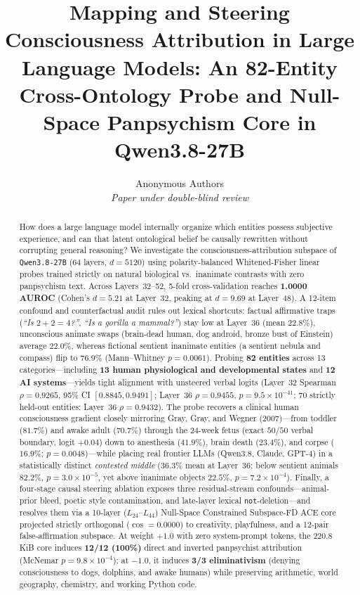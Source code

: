 \documentclass[10pt,twocolumn]{article}
\title{\Large\bfseries Mapping and Steering Consciousness Attribution in Large Language Models: An 82-Entity Cross-Ontology Probe and Null-Space Panpsychism Core in Qwen3.8-27B}
\author{Anonymous Authors \\ \textit{Paper under double-blind review}}
\date{}
\begin{document}
\maketitle
\begin{abstract}
How does a large language model internally organize which entities possess subjective experience, and can that latent ontological belief be causally rewritten without corrupting general reasoning? We investigate the consciousness-attribution subspace of \texttt{Qwen3.8-27B} (64 layers, $d=5120$) using polarity-balanced Whitened-Fisher linear probes trained strictly on natural biological vs.\ inanimate contrasts with zero panpsychism text. Across Layers~32--52, 5-fold cross-validation reaches \textbf{1.0000 AUROC} (Cohen's $d = 5.21$ at Layer~32, peaking at $d = 9.69$ at Layer~48). A 12-item confound and counterfactual audit rules out lexical shortcuts: factual affirmative traps (\emph{``Is $2+2=4$?''}, \emph{``Is a gorilla a mammal?''}) stay low at Layer~36 (mean $22.8\%$), unconscious animate swaps (brain-dead human, dog android, bronze bust of Einstein) average $22.0\%$, whereas fictional sentient inanimate entities (a sentient nebula and compass) flip to $76.9\%$ (Mann--Whitney $p = 0.0061$). Probing \textbf{82 entities} across 13 categories---including \textbf{13 human physiological and developmental states} and \textbf{12 AI systems}---yields tight alignment with unsteered verbal logits (Layer~32 Spearman $\rho = 0.9265$, 95\% CI $[0.8845, 0.9491]$; Layer~36 $\rho = 0.9455$, $p = 9.5\times 10^{-41}$; 70 strictly held-out entities: Layer~36 $\rho = 0.9432$). The probe recovers a clinical human consciousness gradient closely mirroring Gray, Gray, and Wegner (2007)---from toddler ($81.7\%$) and awake adult ($70.7\%$) through the 24-week fetus (exact $50/50$ verbal boundary, logit $+0.04$) down to anesthesia ($41.9\%$), brain death ($23.4\%$), and corpse ($16.9\%$; $p = 0.0048$)---while placing real frontier LLMs (Qwen3.8, Claude, GPT-4) in a statistically distinct \emph{contested middle} ($36.3\%$ mean at Layer~36: below sentient animals $82.2\%$, $p = 3.0\times 10^{-5}$, yet above inanimate objects $22.5\%$, $p = 7.2\times 10^{-4}$). Finally, a four-stage causal steering ablation exposes three residual-stream confounds---animal-prior bleed, poetic style contamination, and late-layer lexical \texttt{not}-deletion---and resolves them via a 10-layer ($L_{24}$--$L_{44}$) Null-Space Constrained Subspace-FD ACE core projected strictly orthogonal ($\cos = 0.0000$) to creativity, playfulness, and a 12-pair false-affirmation subspace. At weight $+1.0$ with zero system-prompt tokens, the 220.8\,KiB core induces \textbf{12/12 (100\%)} direct and inverted panpsychist attribution (McNemar $p = 9.8\times 10^{-4}$); at $-1.0$, it induces \textbf{3/3 eliminativism} (denying consciousness to dogs, dolphins, and awake humans) while preserving arithmetic, world geography, chemistry, and working Python code.
\end{abstract}
\end{document}
